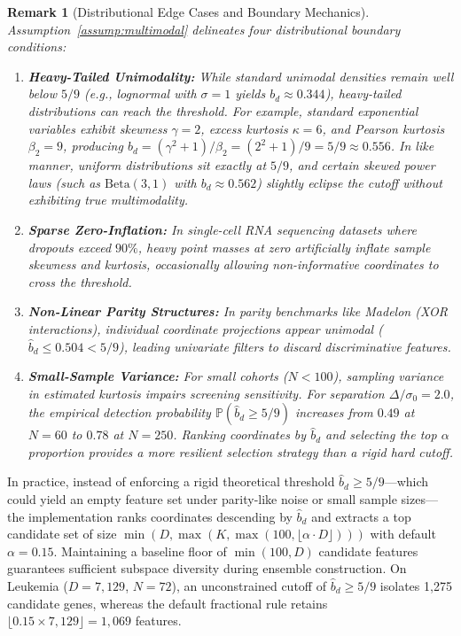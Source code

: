 \documentclass[pdflatex,sn-mathphys-num]{sn-jnl}
\theoremstyle{thmstyleone}
\theoremstyle{thmstyletwo}
\newtheorem{remark}{Remark}
\theoremstyle{thmstylethree}
\begin{document}
\begin{remark}[Distributional Edge Cases and Boundary Mechanics]\label{rem:bgss_limits}
Assumption~\ref{assump:multimodal} delineates four distributional boundary conditions:
\begin{enumerate}
 \item \textbf{Heavy-Tailed Unimodality:} While standard unimodal densities remain well below $5/9$ (e.g., lognormal with $\sigma=1$ yields $b_d \approx 0.344$), heavy-tailed distributions can reach the threshold. For example, standard exponential variables exhibit skewness $\gamma = 2$, excess kurtosis $\kappa = 6$, and Pearson kurtosis $\beta_2 = 9$, producing $b_d = (\gamma^2 + 1)/\beta_2 = (2^2 + 1)/9 = 5/9 \approx 0.556$. In like manner, uniform distributions sit exactly at $5/9$, and certain skewed power laws (such as $\mathrm{Beta}(3, 1)$ with $b_d \approx 0.562$) slightly eclipse the cutoff without exhibiting true multimodality.
 \item \textbf{Sparse Zero-Inflation:} In single-cell RNA sequencing datasets where dropouts exceed $90\%$, heavy point masses at zero artificially inflate sample skewness and kurtosis, occasionally allowing non-informative coordinates to cross the threshold.
 \item \textbf{Non-Linear Parity Structures:} In parity benchmarks like Madelon (XOR interactions), individual coordinate projections appear unimodal ($\hat{b}_d \le 0.504 < 5/9$), leading univariate filters to discard discriminative features.
 \item \textbf{Small-Sample Variance:} For small cohorts ($N < 100$), sampling variance in estimated kurtosis impairs screening sensitivity. For separation $\Delta/\sigma_0 = 2.0$, the empirical detection probability $\mathbb{P}(\hat{b}_d \ge 5/9)$ increases from $0.49$ at $N=60$ to $0.78$ at $N=250$. Ranking coordinates by $\hat{b}_d$ and selecting the top $\alpha$ proportion provides a more resilient selection strategy than a rigid hard cutoff.
\end{enumerate}
\end{remark}

In practice, instead of enforcing a rigid theoretical threshold $\hat{b}_d \ge 5/9$---which could yield an empty feature set under parity-like noise or small sample sizes---the implementation ranks coordinates descending by $\hat{b}_d$ and extracts a top candidate set of size $\min(D, \max(K, \max(100, \lfloor \alpha \cdot D \rfloor)))$ with default $\alpha = 0.15$. Maintaining a baseline floor of $\min(100, D)$ candidate features guarantees sufficient subspace diversity during ensemble construction. On Leukemia ($D=7{,}129$, $N=72$), an unconstrained cutoff of $\hat{b}_d \ge 5/9$ isolates 1,275 candidate genes, whereas the default fractional rule retains $\lfloor 0.15 \times 7{,}129 \rfloor = 1{,}069$ features.
\end{document}
